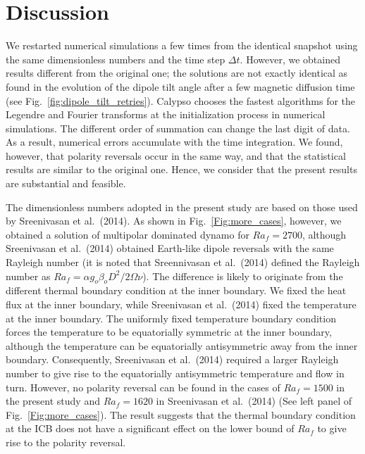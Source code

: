 \section{Discussion}
\label{section:discussion}

We restarted numerical simulations a few times from the identical snapshot using the same dimensionless numbers and the time step $\Delta t$.
However, we obtained results different from the original one; the solutions are not exactly identical
as found in the evolution of the dipole tilt angle after a few magnetic diffusion time (see Fig.~\ref{fig:dipole_tilt_retries}). 
Calypso chooses the fastest algorithms for the Legendre and Fourier transforms at the initialization process in numerical simulations. 
The different order of summation can change the last digit of data. 
As a result, numerical errors accumulate with the time integration. 
We found, however, that polarity reversals occur in the same way, and that the statistical results are similar to the original one.
Hence, we consider that the present results are substantial and feasible.

The dimensionless numbers adopted in the present study are based on those used by Sreenivasan et al.\ (2014). %
As shown in Fig.~\ref{Fig:more_cases}, however, we obtained a solution of multipolar dominated dynamo for $Ra_f = 2700$, although Sreenivasan et al.\ (2014) obtained Earth-like dipole reversals with the same Rayleigh number (it is noted that Sreennivasan et al.\ (2014) defined the Rayleigh number as $Ra_f = \alpha g_o \beta_o D^2 / 2\Omega \nu$).
The difference is likely to originate from the different thermal boundary condition at the inner boundary. 
We fixed the heat flux at the inner boundary, while Sreenivasan et al.\ (2014) fixed the temperature at the inner boundary. 
The uniformly fixed temperature boundary condition forces the temperature to be equatorially symmetric at the inner boundary, although the temperature can be equatorially antisymmetric away from the inner boundary.
Consequently, Sreenivasan et al.\ (2014) required a larger Rayleigh number to give rise to the equatorially antisymmetric temperature and flow in turn. 
However, no polarity reversal can be found in the cases of $Ra_f = 1500$ in the present study and $Ra_f = 1620$ in Sreenivasan et al.\ (2014) (See left panel of Fig.~\ref{Fig:more_cases}). 
The result suggests that the thermal boundary condition at the ICB does not have a significant effect on the lower bound of $Ra_f$ to give rise to the polarity reversal.

